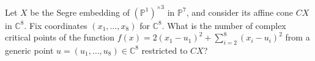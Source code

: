 Let $X$ be the Segre embedding of $(\mathbb{P}^1)^{\times 3}$ in $\mathbb{P}^{7}$, and consider its affine cone $CX$ in $\mathbb{C}^8$. Fix coordinates $(x_1,\ldots,x_8)$ for $\mathbb{C}^8$. What is the number of complex critical points of the function $f(x)=2(x_1-u_1)^2+\sum_{i=2}^8(x_i-u_i)^2$ from a generic point $u=(u_1,\ldots,u_8)\in\mathbb{C}^8$ restricted to $CX$?
